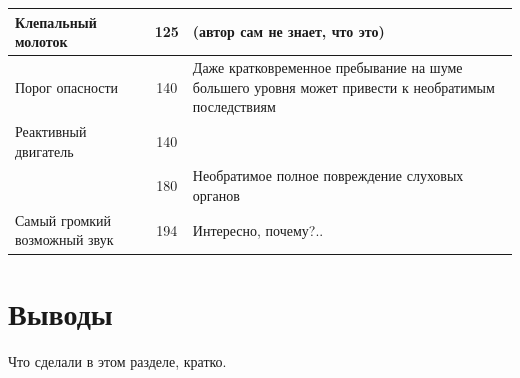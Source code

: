 \begin{center}
\begin{longtable}{|p{}|c|p{}|}
    \hline
    Клепальный молоток           & 125   & \small{(автор сам не знает, что это)}          \\
    \hline
    Порог опасности              & 140   & \small{Даже кратковременное пребывание на
    шуме большего уровня может привести к необратимым последствиям}                       \\
    \hline
    Реактивный двигатель         & 140   &                                                \\
                                 & 180   & \small{Необратимое полное повреждение
                                 слуховых органов}                                        \\
    Самый громкий возможный звук & 194   & \small{Интересно, почему?..}                   \\
  \end{longtable}
\end{center}

\section*{Выводы}

Что сделали в этом разделе, кратко.
